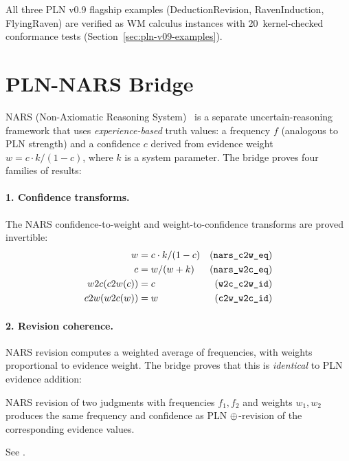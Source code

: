 \documentclass[11pt,openany]{report}
\begin{document}
\noindent
All three PLN v0.9 flagship examples (DeductionRevision,
RavenInduction, FlyingRaven) are verified as WM calculus instances
with 20~kernel-checked conformance tests
(Section~\ref{sec:pln-v09-examples}).

\section{PLN-NARS Bridge}
\label{sec:pln-nars-bridge}

NARS (Non-Axiomatic Reasoning System)~\cite{Wang2013NARS} is a
separate uncertain-reasoning framework that uses \emph{experience-based}
truth values: a frequency $f$ (analogous to PLN strength) and a
confidence $c$ derived from evidence weight $w = c \cdot k / (1 - c)$,
where $k$ is a system parameter.  The bridge proves four families of
results:

\paragraph{1. Confidence transforms.}
The NARS confidence-to-weight and weight-to-confidence transforms
are proved invertible:
\begin{align}
  w &= c \cdot k / (1 - c) & \text{(\texttt{nars\_c2w\_eq})} \\
  c &= w / (w + k) & \text{(\texttt{nars\_w2c\_eq})} \\
  w2c(c2w(c)) &= c & \text{(\texttt{w2c\_c2w\_id})} \\
  c2w(w2c(w)) &= w & \text{(\texttt{c2w\_w2c\_id})}
\end{align}

\paragraph{2. Revision coherence.}
NARS revision computes a weighted average of frequencies, with
weights proportional to evidence weight.  The bridge proves that
this is \emph{identical} to PLN evidence addition:

\begin{theorem}[NARS revision = PLN evidence algebra (\claimCore{})]
NARS revision of two judgments with frequencies $f_1, f_2$ and
weights $w_1, w_2$ produces the same frequency and confidence as
PLN $\oplus$-revision of the corresponding evidence values.
\end{theorem}

\noindent
See .
\end{document}
